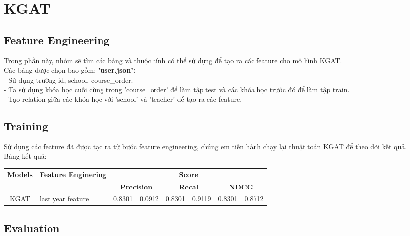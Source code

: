\section{KGAT}
\subsection{Feature Engineering}
Trong phần này, nhóm sẽ tìm các bảng và thuộc tính có thể sử dụng để tạo ra các feature cho mô hình KGAT.\\
Các bảng được chọn bao gồm:
\textbf{'user.json':} \\
- Sử dụng trường id, school, course\_order. \\
- Ta sử dụng khóa học cuối cùng trong 'course\_order' để làm tập test và các khóa học trước đó để làm tập train.\\
- Tạo relation giữa các khóa học với 'school' và 'teacher' để tạo ra các feature.\\
\subsection{Training}
Sử dụng các feature đã được tạo ra từ bước feature engineering, chúng em tiến hành chạy lại thuật toán KGAT để theo dõi kết quả.\\
Bảng kết quả:
\begin{table}[]
    \begin{tabular}{ccclllll}
    \hline
    \multirow{2}{*}{\textbf{Models}} &
      \multirow{2}{*}{\textbf{Feature Enginering}} &
      \multicolumn{6}{c}{\textbf{Score}} \\ \cline{3-8} 
     &
       &
      \multicolumn{2}{c}{\textbf{Precision}} &
      \multicolumn{2}{c}{\textbf{Recal}} &
      \multicolumn{2}{c}{\textbf{NDCG}} \\ \hline
    KGAT &
      \multicolumn{1}{l}{last year feature} &
      \multicolumn{1}{l}{0.8301} &
      0.0912 &
      0.8301 &
      0.9119 &
      0.8301 &
      0.8712
\end{tabular}
\end{table}
\subsection{Evaluation}
